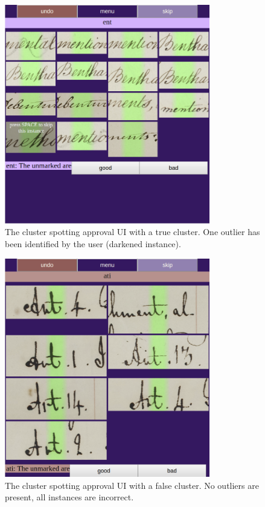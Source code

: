\documentclass[ms,electronic,twosidetoc,letterpaper,chaptercenter,parttop,lof,lot]{byumsphd}
\begin{document}
\begin{figure}
    \centering
    \includegraphics[width=0.8\textwidth]{clustergood2}
    \caption{The cluster spotting approval UI with a true cluster. One outlier has been identified by the user (darkened instance).}
    \label{fig:clustergood}
\end{figure}
\begin{figure}
    \centering
    \includegraphics[width=0.8\textwidth]{clusterbad}
    \caption{The cluster spotting approval UI with a false cluster. No outliers are present, all instances are incorrect.}
    \label{fig:clusterbad}
\end{figure}
\end{document}
